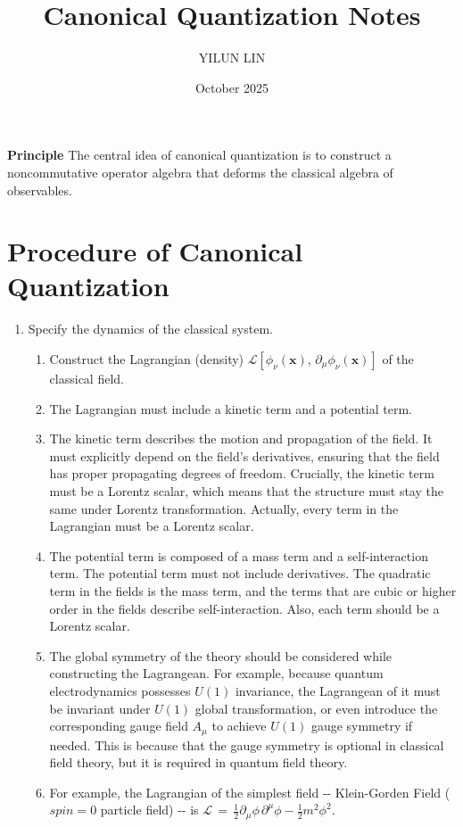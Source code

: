 \documentclass[11pt]{article}
\title{Canonical Quantization Notes}
\author{YILUN LIN}
\date{October 2025}
\numberwithin{equation}{section}
\begin{document}
\maketitle
\Large\textbf{Principle}
\newline
\Large{The central idea of canonical quantization is to construct a noncommutative operator algebra that deforms the classical algebra of observables.}
\section{Procedure of Canonical Quantization}
\begin{enumerate}
    \item Specify the dynamics of the classical system.
    \begin{enumerate}
        \item Construct the Lagrangian (density) $\mathcal{L}\left[\phi_{\nu}\left(\mathbf{x}\right),\,\partial_{\mu}\phi_{\nu}\left(\mathbf{x}\right)\right]$ of the classical field.
        \item The Lagrangian must include a kinetic term and a potential term. 
        \item The kinetic term describes the motion and propagation of the field. It must explicitly depend on the field's derivatives, ensuring that the field has proper propagating degrees of freedom. Crucially, the kinetic term must be a Lorentz scalar, which means that the structure must stay the same under Lorentz transformation. Actually, every term in the Lagrangian must be a Lorentz scalar. 
        \item The potential term is composed of a mass term and a self-interaction term. The potential term must not include derivatives. The quadratic term in the fields is the mass term, and the terms that are cubic or higher order in the fields describe self-interaction. Also, each term should be a Lorentz scalar. 
        \item The global symmetry of the theory should be considered while constructing the Lagrangean. For example, because quantum electrodynamics possesses $U\left(1\right)$ invariance, the Lagrangean of it must be invariant under $U\left(1\right)$ global transformation, or even introduce the corresponding gauge field $A_{\mu}$ to achieve $U\left(1\right)$ gauge symmetry if needed. This is because that the gauge symmetry is optional in classical field theory, but it is required in quantum field theory. 
        \item For example, the Lagrangian of the simplest field \--\-- Klein-Gorden Field ($spin=0$ particle field) \--\-- is $\mathcal{L}\,=\,\frac{1}{2}\partial_{\mu}\phi\,\partial^{\mu}\phi-\frac{1}{2}m^{2}\phi^{2}$.

\end{enumerate}
\end{enumerate}
\end{document}
